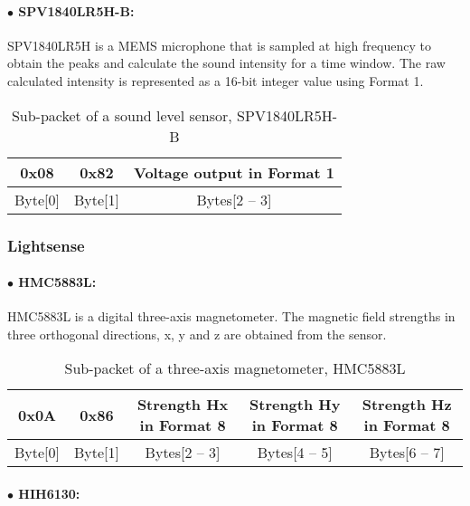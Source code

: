 \paragraph{$\bullet$ SPV1840LR5H-B:}

SPV1840LR5H is a MEMS microphone that is sampled at high frequency to obtain
the peaks and calculate the sound intensity for a time window. The raw calculated
intensity is represented as a 16-bit integer value using Format 1.


\begin{table}[h!]
    \centering
    \caption{Sub-packet of a sound level sensor, SPV1840LR5H-B}
    \begin{tabular}{|c|c|c|}
        \hline
        \rowcolor{black!8}
        \textbf{0x08} & \textbf{0x82} & \textbf{Voltage output in Format 1} \\
        \hline
        Byte[0] & Byte[1] & Bytes[2 -- 3]\\ \hline
    \end{tabular}
\end{table}


\subsubsection{Lightsense}

\paragraph{$\bullet$ HMC5883L:}
HMC5883L is a digital three-axis magnetometer. The magnetic field strengths in three orthogonal directions,
x, y and z are obtained from the sensor.


\begin{table}[h!]
    \centering
    \caption{Sub-packet of a three-axis magnetometer, HMC5883L}
    \begin{tabular}{|c|c|c|c|c|}
        \hline
        \rowcolor{black!8}
        \textbf{0x0A} & \textbf{0x86} & \textbf{Strength Hx in Format 8} & \textbf{Strength Hy in Format 8} & \textbf{Strength Hz in Format 8}\\
        \hline
        Byte[0] & Byte[1] & Bytes[2 -- 3] & Bytes[4 -- 5] & Bytes[6 -- 7] \\ \hline
    \end{tabular}
\end{table}



\paragraph{$\bullet$ HIH6130:}


